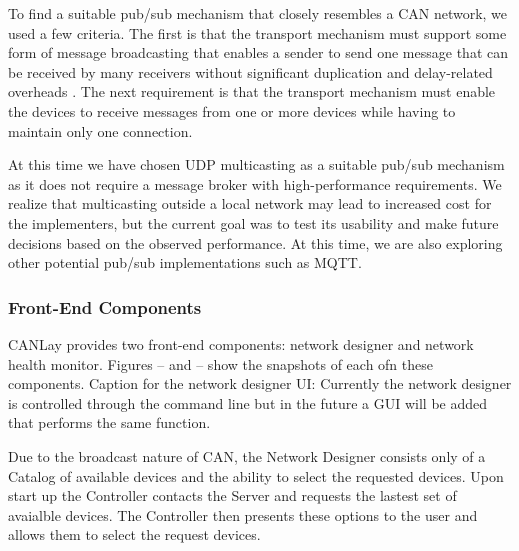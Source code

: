 \documentclass[letterpaper,twocolumn,10pt]{article}
\begin{document}
To find a suitable pub/sub mechanism that closely resembles a CAN network, we used a few criteria. The first is that the transport mechanism must support some form of message broadcasting that enables a sender to send one message that can be received by many receivers without significant duplication and delay-related overheads \cite{kaiser_implementing_1999}. The next requirement is that the transport mechanism must enable the devices to receive messages from one or more devices while having to maintain only one connection.

At this time we have chosen UDP multicasting as a suitable pub/sub mechanism as it does not require a message broker with high-performance requirements. We realize that multicasting outside a local network may lead to increased cost for the implementers, but the current goal was to test its usability and make future decisions based on the observed performance. At this time, we are also exploring other potential pub/sub implementations such as MQTT.


\subsubsection{Front-End Components}
CANLay provides two front-end components: network designer and network health monitor. Figures -- and -- show the snapshots of each ofn these components. 
Caption for the network designer UI: Currently the network designer is controlled through the command line but in the future a GUI will be added that performs the same function.

Due to the broadcast nature of CAN, the Network Designer consists only of a Catalog of available devices and the ability to select the requested devices. Upon start up the Controller contacts the Server and requests the lastest set of avaialble devices. The Controller then presents these options to the user and allows them to select the request devices.
\end{document}

